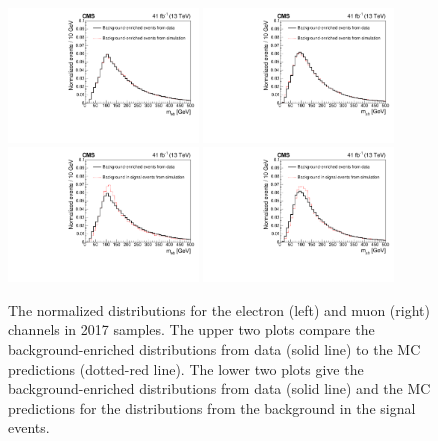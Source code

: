 \begin{figure}
    \centering
    \includegraphics[width=0.45\textwidth]{figure/BGClosureTest_17_el_CR_chi2_20_wobtag.pdf}
    \includegraphics[width=0.45\textwidth]{figure/BGClosureTest_17_mu_CR_chi2_20_wobtag.pdf}
    \includegraphics[width=0.45\textwidth]{figure/BGClosureTest_17_el_SR_chi2_20_wobtag.pdf}
    \includegraphics[width=0.45\textwidth]{figure/BGClosureTest_17_mu_SR_chi2_20_wobtag.pdf}
    \caption[The normalized \Mlb distributions in 2017 samples.]
    {
        The normalized \Mlb distributions for the electron (left) and muon (right) channels in 2017 samples.
        The upper two plots compare the background-enriched distributions from data (solid line) to the MC predictions (dotted-red line).
        The lower two plots give the background-enriched distributions from data (solid line) and the MC predictions for the distributions from the background in the signal events.
    }
    \label{fig:CR_SR_closure_test17}
\end{figure}

